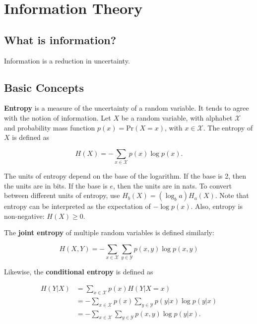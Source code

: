 \chapter{Information Theory}

\section{What is information?}

Information is a reduction in uncertainty.

\section{Basic Concepts}

\textbf{Entropy} is a measure of the uncertainty of a random variable. It tends to agree with the notion of information. Let $X$ be a random variable, with alphabet $\mathcal{X}$ and probability mass function $p(x) = \text{Pr} (X = x)$, with $x \in \mathcal{X}$. The entropy of $X$ is defined as

\begin{equation}
	H(X) = - \sum_{x \in \mathcal{X}} p(x) \log p(x).
	\label{eq: entropy_definition}
\end{equation}

\noindent The units of entropy depend on the base of the logarithm. If the base is 2, then the units are in bits. If the base is $e$, then the units are in nats. To convert between different units of entropy, use $H_b (X) = (\log_b a) H_a (X)$. Note that entropy can be interpreted as the expectation of $-\log p(x)$. Also, entropy is non-negative: $H(X) \geq 0$.

The \textbf{joint entropy} of multiple random variables is defined similarly:

\begin{equation}
	H(X, Y) = - \sum_{x \in \mathcal{X}} \sum_{y \in \mathcal{Y}} p(x, y) \log p(x, y)
	\label{eq: joint_entropy_definition}
\end{equation}

\noindent Likewise, the \textbf{conditional entropy} is defined as

\begin{align*}
	H(Y | X) &= \sum_{x \in \mathcal{X}} p(x) H(Y | X = x) \\
		     &= - \sum_{x \in \mathcal{X}} p(x) \sum_{y \in \mathcal{Y}} p(y | x) \log p(y | x) \\
		     &= - \sum_{x \in \mathcal{X}} \sum_{y \in \mathcal{Y}} p(x, y) \log p(y | x).
	\label{eq: conditional_entropy_definition}
\end{align*}

